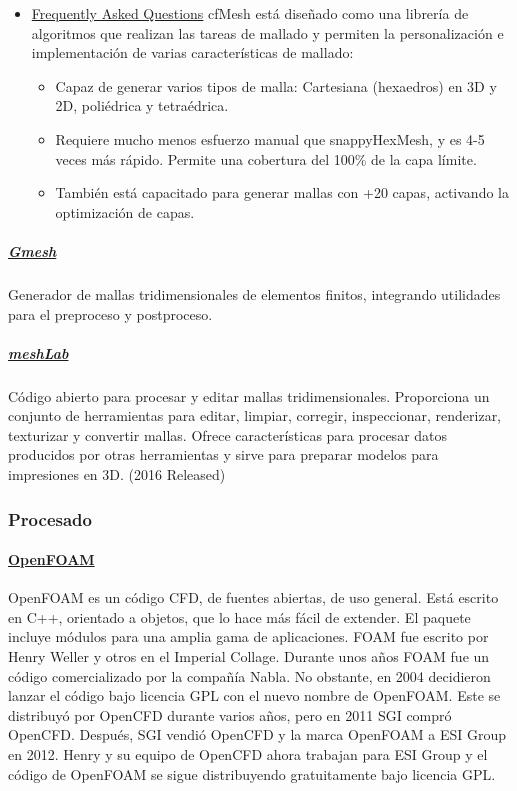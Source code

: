 \begin{itemize}
\item
  \href{http://cfmesh.com/support-faq/}{Frequently Asked Questions}
  cfMesh está diseñado como una librería de algoritmos que realizan las
  tareas de mallado y permiten la personalización e implementación de
  varias características de mallado:

  \begin{itemize}
  \item
    Capaz de generar varios tipos de malla: Cartesiana (hexaedros) en 3D
    y 2D, poliédrica y tetraédrica.
  \item
    Requiere mucho menos esfuerzo manual que snappyHexMesh, y es 4-5
    veces más rápido. Permite una cobertura del 100\% de la capa límite.
  \item
    También está capacitado para generar mallas con +20 capas, activando
    la optimización de capas.
  \end{itemize}
\end{itemize}

\subparagraph{\texorpdfstring{
\href{http://gmsh.info/}{Gmesh}}{Gmesh}}\label{header-n262}

Generador de mallas tridimensionales de elementos finitos, integrando
utilidades para el preproceso y postproceso.

\subparagraph{\texorpdfstring{
\href{http://www.meshlab.net/}{meshLab}}{meshLab}}\label{header-n265}

Código abierto para procesar y editar mallas tridimensionales.
Proporciona un conjunto de herramientas para editar, limpiar, corregir,
inspeccionar, renderizar, texturizar y convertir mallas. Ofrece
características para procesar datos producidos por otras herramientas y
sirve para preparar modelos para impresiones en 3D. (2016 Released)

\subsubsection{Procesado}\label{header-n269}

\paragraph{\texorpdfstring{
\href{https://openfoam.org/}{OpenFOAM}}{OpenFOAM}}\label{header-n271}

OpenFOAM es un código CFD, de fuentes abiertas, de uso general. Está
escrito en C++, orientado a objetos, que lo hace más fácil de extender.
El paquete incluye módulos para una amplia gama de aplicaciones. FOAM
fue escrito por Henry Weller y otros en el Imperial Collage. Durante
unos años FOAM fue un código comercializado por la compañía Nabla. No
obstante, en 2004 decidieron lanzar el código bajo licencia GPL con el
nuevo nombre de OpenFOAM. Este se distribuyó por OpenCFD durante varios
años, pero en 2011 SGI compró OpenCFD. Después, SGI vendió OpenCFD y la
marca OpenFOAM a ESI Group en 2012. Henry y su equipo de OpenCFD ahora
trabajan para ESI Group y el código de OpenFOAM se sigue distribuyendo
gratuitamente bajo licencia GPL.

